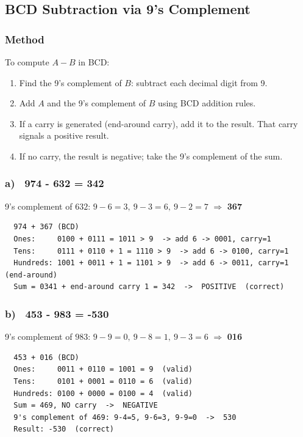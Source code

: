 \documentclass[12pt,a4paper]{article}
\begin{document}
\subsection{BCD Subtraction via 9's Complement}

\subsubsection{Method}
To compute $A - B$ in BCD:
\begin{enumerate}
    \item Find the 9's complement of $B$: subtract each decimal digit from 9.
    \item Add $A$ and the 9's complement of $B$ using BCD addition rules.
    \item If a carry is generated (end-around carry), add it to the result.
    That carry signals a positive result.
    \item If no carry, the result is negative; take the 9's complement of the sum.
\end{enumerate}

\subsubsection{a) \ 974 - 632 = 342}

9's complement of $632$: $9-6=3,\ 9-3=6,\ 9-2=7$ $\Rightarrow$ \textbf{367}

\begin{verbatim}
  974 + 367 (BCD)
  Ones:     0100 + 0111 = 1011 > 9  -> add 6 -> 0001, carry=1
  Tens:     0111 + 0110 + 1 = 1110 > 9  -> add 6 -> 0100, carry=1
  Hundreds: 1001 + 0011 + 1 = 1101 > 9  -> add 6 -> 0011, carry=1 (end-around)
  Sum = 0341 + end-around carry 1 = 342  ->  POSITIVE  (correct)
\end{verbatim}

\subsubsection{b) \ 453 - 983 = -530}

9's complement of $983$: $9-9=0,\ 9-8=1,\ 9-3=6$ $\Rightarrow$ \textbf{016}

\begin{verbatim}
  453 + 016 (BCD)
  Ones:     0011 + 0110 = 1001 = 9  (valid)
  Tens:     0101 + 0001 = 0110 = 6  (valid)
  Hundreds: 0100 + 0000 = 0100 = 4  (valid)
  Sum = 469, NO carry  ->  NEGATIVE
  9's complement of 469: 9-4=5, 9-6=3, 9-9=0  ->  530
  Result: -530  (correct)
\end{verbatim}
\end{document}
